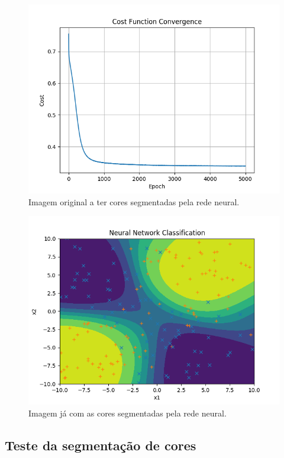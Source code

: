\documentclass[conference]{IEEEtran}
\begin{document}
\begin{figure}[htbp]
\centering
\centerline{\includegraphics[scale=0.5]{imagens/xor/convergence_xor.png}}
\caption{Imagem original a ter cores segmentadas pela rede neural.}
\label{xor/convergence_xor}
\end{figure}

\begin{figure}[htbp]
\centering
\centerline{\includegraphics[scale=0.5]{imagens/xor/nn_classification_xor.png}}
\caption{Imagem já com as cores segmentadas pela rede neural.}
\label{xor/nn_classification_xor}
\end{figure}

\subsection{Teste da segmentação de cores}
\end{document}
